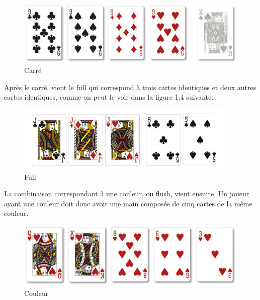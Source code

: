 \documentclass{report}
\begin{document}
		\begin{figure}[h]
			\begin{center}
				\includegraphics[scale=0.3]{./imagesRapport/carre.jpg}
			\end{center}
			\caption[Carré]{Carré}
		\end{figure}
		\medskip



Après le carré, vient le full qui correspond à trois cartes identiques et deux autres cartes identiques, comme on peut le voir dans la figure 1.4 suivante. \par


		\begin{figure}[h]
			\begin{center}
				\includegraphics[scale=0.4]{./imagesRapport/full.jpg}
			\end{center}
			\caption[Full]{Full}
		\end{figure}
		\medskip

La combinaison correspondant à une couleur, ou flush, vient ensuite. Un joueur ayant une couleur doit donc avoir une main composée de cinq cartes de la même couleur.\par

		\begin{figure}[h]
			\begin{center}
				\includegraphics[scale=0.3]{./imagesRapport/couleur.jpg}
			\end{center}
			\caption[Couleur]{Couleur}
		\end{figure}
		\medskip
\end{document}
